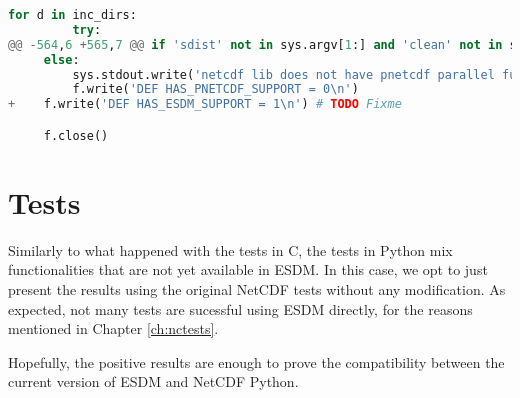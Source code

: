 \begin{lstlisting}[language=python,upquote=true]
     for d in inc_dirs:
         try:
@@ -564,6 +565,7 @@ if 'sdist' not in sys.argv[1:] and 'clean' not in sys.argv[1:]:
     else:
         sys.stdout.write('netcdf lib does not have pnetcdf parallel functions\n')
         f.write('DEF HAS_PNETCDF_SUPPORT = 0\n')
+    f.write('DEF HAS_ESDM_SUPPORT = 1\n') # TODO Fixme

     f.close()
\end{lstlisting}

\section{Tests}

Similarly to what happened with the tests in C, the tests in Python mix functionalities that are not yet available in ESDM.
In this case, we opt to just present the results using the original NetCDF tests without any modification.
As expected, not many tests are sucessful using ESDM directly, for the reasons mentioned in Chapter \ref{ch:nctests}.

Hopefully, the positive results are enough to prove the compatibility between the current version of ESDM and NetCDF Python.

